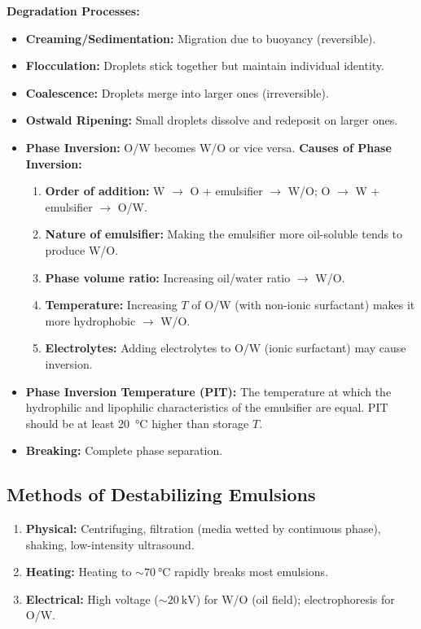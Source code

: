 \textbf{Degradation Processes:}
\begin{itemize}
    \item \textbf{Creaming/Sedimentation:} Migration due to buoyancy (reversible).
    \item \textbf{Flocculation:} Droplets stick together but maintain individual identity.
    \item \textbf{Coalescence:} Droplets merge into larger ones (irreversible).
    \item \textbf{Ostwald Ripening:} Small droplets dissolve and redeposit on larger ones.
    \item \textbf{Phase Inversion:} O/W becomes W/O or vice versa.
        \textbf{Causes of Phase Inversion:}
        \begin{enumerate}
            \item \textbf{Order of addition:} W $\to$ O + emulsifier $\to$ W/O; O $\to$ W + emulsifier $\to$ O/W.
            \item \textbf{Nature of emulsifier:} Making the emulsifier more oil-soluble tends to produce W/O.
            \item \textbf{Phase volume ratio:} Increasing oil/water ratio $\to$ W/O.
            \item \textbf{Temperature:} Increasing $T$ of O/W (with non-ionic surfactant) makes it more hydrophobic $\to$ W/O.
            \item \textbf{Electrolytes:} Adding electrolytes to O/W (ionic surfactant) may cause inversion.
        \end{enumerate}
    \item \textbf{Phase Inversion Temperature (PIT):} The temperature at which the hydrophilic and lipophilic characteristics of the emulsifier are equal. PIT should be at least \SI{20}{\celsius} higher than storage $T$.
    \item \textbf{Breaking:} Complete phase separation.
\end{itemize}

\subsection{Methods of Destabilizing Emulsions}
\begin{enumerate}
    \item \textbf{Physical:} Centrifuging, filtration (media wetted by continuous phase), shaking, low-intensity ultrasound.
    \item \textbf{Heating:} Heating to $\sim \SI{70}{\celsius}$ rapidly breaks most emulsions.
    \item \textbf{Electrical:} High voltage ($\sim \SI{20}{\kV}$) for W/O (oil field); electrophoresis for O/W.
\end{enumerate}

